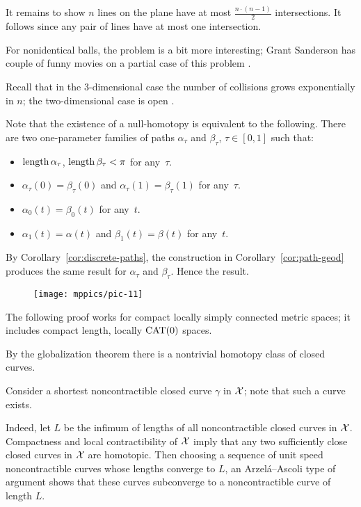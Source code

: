 It remains to show $n$ lines on the plane have at most $\tfrac{n\cdot(n-1)}2$ intersections.
It follows since any pair of lines have at most one intersection.

For nonidentical balls, the problem is a bit more interesting;
Grant Sanderson has couple of funny movies on a partial case of this problem \cite{sanderson}.

Recall that in the 3-dimensional case the number of collisions grows exponentially in $n$; the two-dimensional case is open \cite{burago-ivanov}.

Note that the existence of a null-homotopy is equivalent to the following.
There are two one-parameter families of paths $\alpha_\tau$ and $\beta_\tau$, $\tau\in[0,1]$ 
such that: 
\begin{itemize}
\item $\mathop{\rm length}\nolimits\alpha_\tau$, $\mathop{\rm length}\nolimits\beta_\tau<\pi$ for any~$\tau$.
\item $\alpha_\tau(0)=\beta_\tau(0)$ and $\alpha_\tau(1)=\beta_\tau(1)$ for any~$\tau$.
\item $\alpha_0(t)=\beta_0(t)$ for any~$t$.
\item $\alpha_1(t)=\alpha(t)$ and $\beta_1(t)=\beta(t)$ for any~$t$.
\end{itemize}

By Corollary~\ref{cor:discrete-paths},
the construction in Corollary~\ref{cor:path-geod} produces the same result for $\alpha_\tau$ and $\beta_\tau$.
Hence the result.


\begin{wrapfigure}{r}{25 mm}
\vskip-4mm
\centering
\texttt{[image: mppics/pic-11]}
\end{wrapfigure}

The following proof works for compact locally simply connected metric spaces;
it includes compact length, locally $\mathrm{CAT}(0)$ spaces. 

\medskip


By the globalization theorem there is  a nontrivial homotopy class of closed curves.

Consider a shortest noncontractible closed curve $\gamma$ in  $\mathcal{X}$;
note that such a curve exists.

Indeed, let $L$ be the infimum of lengths of all noncontractible closed curves in $\mathcal{X}$.
Compactness and local contractibility of $\mathcal{X}$ imply that any two sufficiently close closed curves in $\mathcal{X}$ are homotopic.
Then choosing a sequence of unit speed noncontractible curves whose lengths converge to $L$, an Arzel\'{a}--Ascoli type of argument shows that these curves subconverge to a noncontractible curve of length $L$.


